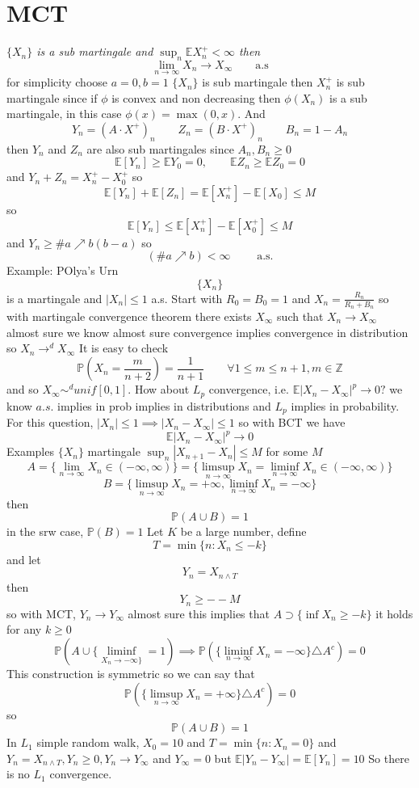 \documentclass[11pt]{article}
\begin{document}
\section{MCT}
\emph{
    $\{X_n\}$ is a sub martingale and  $\sup_{n} \mathbb{E}X_n^{+} < \infty$  then
    \[
        \lim_{n\to \infty}X_n \rightarrow X_\infty \qquad \text{a.s}
    \] 
}
for simplicity choose $a = 0, b =1$  $\{X_n\}$ is sub martingale then  $X_n^{+}$ is sub martingale
since if $\phi$ is convex and non decreasing then $\phi(X_n)$ is a sub martingale, in this case $\phi(x) = \max(0,x)$.
And
\[
Y_n = (A \cdot X^{+})_n \qquad Z_n = (B \cdot X^{+})_n  \qquad B_n = 1 - A_n
\] 
then $Y_n$ and  $Z_n$ are also sub martingales since  $A_n, B_n \ge 0$ 
\[
    \mathbb{E}[Y_n] \ge \mathbb{E}Y_0 = 0, \qquad \mathbb{E}Z_n \ge \mathbb{E}Z_0 = 0
\] 
and $Y_n + Z_n = X_n^{+} - X_0^{+}$ so
\[
    \mathbb{E}[Y_n] + \mathbb{E}[Z_n] = \mathbb{E}[X_n^{+}] - \mathbb{E}[X_0] \le M
\] 
so
\[
    \mathbb{E}[Y_n] \le \mathbb{E}[X_{n}^{+}] - \mathbb{E}[X_0^{+}] \le M
\] 
and $Y_n \ge \#a \nearrow b (b-a)$ so
 \[
     (\# a \nearrow b) < \infty \qquad \text{ a.s.}
\] 
Example: POlya's Urn
\[
    \{X_n\}
\] 
is a martingale and $|X_n| \le 1$ a.s. Start with  $R_0 = B_0 = 1$ and $X_n = \frac{R_n}{R_n + B_n}$ 
so with martingale convergence theorem there exists $X_\infty$ such that $X_n \rightarrow X_\infty$ almost sure
we know almost sure convergence implies convergence in distribution so $X_n \rightarrow^{d} X_\infty$
It is easy to check
\[
\mathbb{P}(X_n = \frac{m}{n+2}) = \frac{1}{n+1} \qquad \forall 1 \le m \le n + 1, m \in  \mathbb{Z}
\] 
and so $X_\infty \sim^{d} unif[0,1]$.
How about $L_p$ convergence, i.e.  $ \mathbb{E}|X_n - X_\infty|^{p} \rightarrow 0?$ we know
$a.s.$ implies in prob implies in distributions and  $L_p$ implies in probability.
For this question,  $|X_n| \le 1 \implies |X_n - X_\infty| \le 1$ so with BCT we have
\[
\mathbb{E}|X_n - X_\infty|^{p} \rightarrow 0
\] 
Examples $\{X_n\}$ martingale  $\sup_n |X_{n+1} - X_n| \le M$ for some  $M$ 
\[
    A = \{\lim_{n\to  \infty}X_n \in (-\infty,\infty)\} = \{ \limsup_{n\to \infty}X_n = \liminf_{n\to \infty}X_n \in (-\infty,\infty)\}
\] 
\[
    B = \{\limsup_{n\to \infty}X_n = +\infty , \liminf_{ n\to \infty}X_n = -\infty\}
\] 
then
\[
\mathbb{P}(A \cup B) = 1
\] 
in the srw case, $ \mathbb{P}(B) = 1$ Let $K$ be a large number, define
 \[
     T = \min\{n : X_n \le -k\}
\] 
and let
\[
    Y_n = X_{n \wedge T}
\] 
then
\[
Y_n \ge - - M
\] 
so with MCT, $Y_n \rightarrow Y_\infty$ almost sure this implies that $ A \supset \{\inf X_n \ge -k\}$ it holds for any $k \ge 0$ 
 \[
     \mathbb{P}(A \cup \{\liminf_{ X_n\to  -\infty\}} = 1) \implies \mathbb{P}(\{\liminf_{n\to \infty} X_n = -\infty\} \triangle A^{c}) = 0
\] 
This construction is symmetric so we can say that
\[
    \mathbb{P}(\{\limsup_{n\to \infty}X_n = +\infty\} \triangle A^{c}) = 0
\] 
so
\[
    \mathbb{P}(A \cup B) = 1
\] 
In $L_1$ simple random walk, $X_0 = 10$ and  $T = \min\{n: X_n = 0\}$ and  $Y_n = X_{n \wedge T}, Y_n \ge 0, Y_n \rightarrow Y_\infty$ and $Y_\infty = 0$ but $ \mathbb{E}|Y_n - Y_\infty| = \mathbb{E}[Y_n] = 10$
So there is no $L_1$ convergence.
\end{document}
